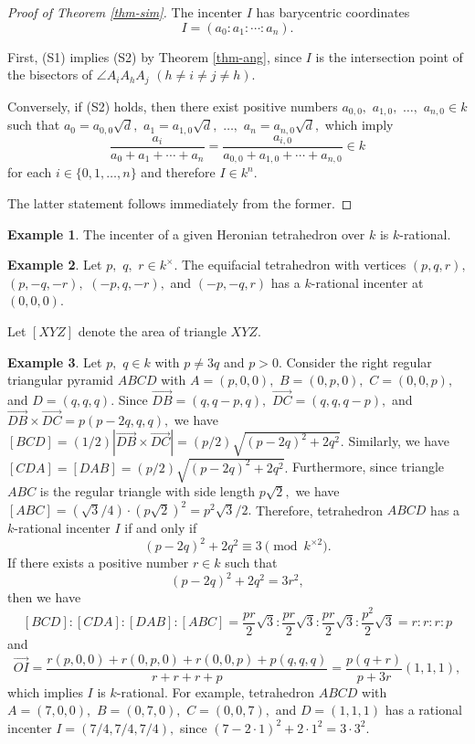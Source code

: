 \documentclass{article}
\theoremstyle{definition}
\newtheorem{eg}{Example}
\theoremstyle{plain}
\newenvironment{pf}{\begin{proof}}{\end{proof}}
\begin{document}
\begin{pf}[Proof of Theorem \ref{thm-sim}]
The incenter $I$ has barycentric coordinates 
\[ I = (a_0:a_1:\cdots :a_n).\]\par 
First, (S1) implies (S2) by Theorem \ref{thm-ang}, since $I$ is the intersection point of the bisectors of $\angle A_iA_hA_j$ $(h \neq i \neq j \neq h).$\par
Conversely, if (S2) holds, then there exist positive numbers $a_{0,0},$ $a_{1,0},$ $\dots,$ $a_{n,0} \in k$ such that $a_0 = a_{0,0}\sqrt d,$ $a_1 = a_{1,0}\sqrt d,$ $\dots,$ $a_n = a_{n,0}\sqrt d,$ which imply 
\[\frac{a_i}{a_0+a_1+\cdots +a_n} = \frac{a_{i,0}}{a_{0,0}+a_{1,0}+\cdots +a_{n,0}} \in k\] 
for each $i \in \{ 0,1,\dots,n\}$ and therefore $I \in k^n.$\par
The latter statement follows immediately from the former.
\end{pf}
\begin{eg}
The incenter of a given Heronian tetrahedron over $k$ is $k$-rational.
\end{eg}
\begin{eg}
Let $p,$ $q,$ $r \in k^\times.$ 
The equifacial tetrahedron with vertices $(p,q,r),$ $(p,-q,-r),$ $(-p,q,-r),$ and $(-p,-q,r)$ has a $k$-rational incenter at $(0,0,0).$
\end{eg}
Let $[XYZ]$ denote the area of triangle $XYZ.$
\begin{eg}
Let $p,$ $q \in k$ with $p \neq 3q$ and $p > 0.$ 
Consider the right regular triangular pyramid $ABCD$ with $A = (p,0,0),$ $B = (0,p,0),$ $C = (0,0,p),$ and $D = (q,q,q).$ 
Since $\overrightarrow{DB} = (q,q-p,q),$ $\overrightarrow{DC} = (q,q,q-p),$ and $\overrightarrow{DB}\times\overrightarrow{DC} = p(p-2q,q,q),$ we have $[BCD] = (1/2)|\overrightarrow{DB}\times\overrightarrow{DC}| = (p/2)\sqrt{(p-2q)^2+2q^2}.$ 
Similarly, we have $[CDA] = [DAB] = (p/2)\sqrt{(p-2q)^2+2q^2}.$ 
Furthermore, since triangle $ABC$ is the regular triangle with side length $p\sqrt 2,$ we have $[ABC] = (\sqrt 3/4)\cdot (p\sqrt 2)^2 = p^2\sqrt 3/2.$ 
Therefore, tetrahedron $ABCD$ has a $k$-rational incenter $I$ if and only if 
\[ (p-2q)^2+2q^2 \equiv 3 \pmod{k^{\times 2}}.\] 
If there exists a positive number $r \in k$ such that 
\[ (p-2q)^2+2q^2 = 3r^2,\] 
then we have 
\[ [BCD]:[CDA]:[DAB]:[ABC] = \frac{pr}{2}\sqrt 3:\frac{pr}{2}\sqrt 3:\frac{pr}{2}\sqrt 3:\frac{p^2}{2}\sqrt 3 = r:r:r:p\] 
and 
\[\overrightarrow{OI} = \frac{r(p,0,0)+r(0,p,0)+r(0,0,p)+p(q,q,q)}{r+r+r+p} = \frac{p(q+r)}{p+3r}(1,1,1),\] 
which implies $I$ is $k$-rational. 
For example, tetrahedron $ABCD$ with $A = (7,0,0),$ $B = (0,7,0),$ $C = (0,0,7),$ and $D = (1,1,1)$ has a rational incenter $I = (7/4,7/4,7/4),$ since $(7-2\cdot 1)^2+2\cdot 1^2 = 3\cdot 3^2.$
\end{eg}
\end{document}
